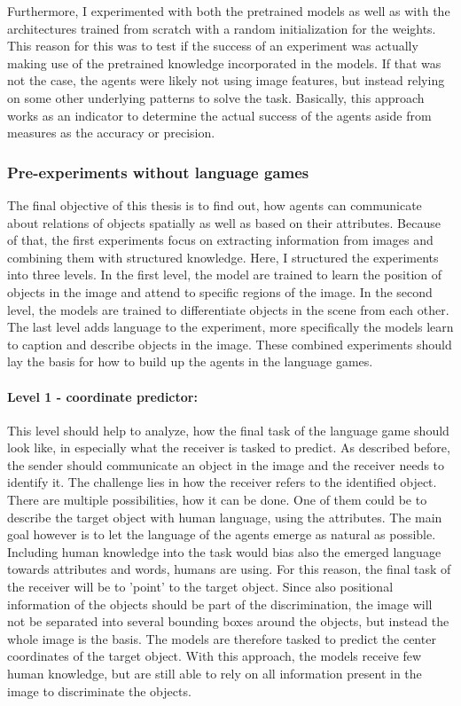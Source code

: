 Furthermore, I experimented with both the pretrained models as well as with the architectures trained from scratch with a random initialization for the weights.
This reason for this was to test if the success of an experiment was actually making use of the pretrained knowledge incorporated in the models.
If that was not the case, the agents were likely not using image features, but instead relying on some other underlying patterns to solve the task.
Basically, this approach works as an indicator to determine the actual success of the agents aside from measures as the accuracy or precision.


\subsubsection{Pre-experiments without language games}
The final objective of this thesis is to find out, how agents can communicate about relations of objects spatially as well as based on their attributes.
Because of that, the first experiments focus on extracting information from images and combining them with structured knowledge.
Here, I structured the experiments into three levels.
In the first level, the model are trained to learn the position of objects in the image and attend to specific regions of the image.
In the second level, the models are trained to differentiate objects in the scene from each other.
The last level adds language to the experiment, more specifically the models learn to caption and describe objects in the image.
These combined experiments should lay the basis for how to build up the agents in the language games.

\paragraph{Level 1 - coordinate predictor:}

This level should help to analyze, how the final task of the language game should look like, in especially what the receiver is tasked to predict.
As described before, the sender should communicate an object in the image and the receiver needs to identify it.
The challenge lies in how the receiver refers to the identified object.
There are multiple possibilities, how it can be done.
One of them could be to describe the target object with human language, using the attributes.
The main goal however is to let the language of the agents emerge as natural as possible.
Including human knowledge into the task would bias also the emerged language towards attributes and words, humans are using.
For this reason, the final task of the receiver will be to 'point' to the target object.
Since also positional information of the objects should be part of the discrimination, the image will not be separated into several bounding boxes around the objects, but instead the whole image is the basis.
The models are therefore tasked to predict the center coordinates of the target object.
With this approach, the models receive few human knowledge, but are still able to rely on all information present in the image to discriminate the objects.

